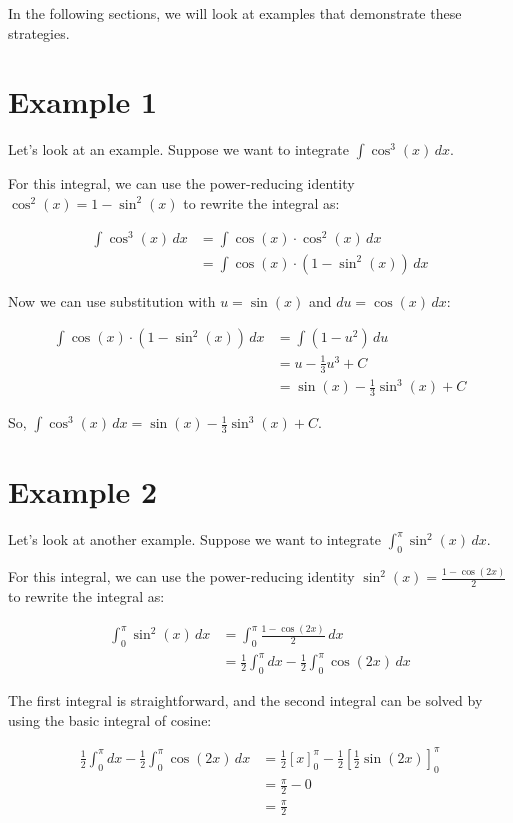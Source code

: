 \documentclass{article}
\begin{document}
In the following sections, we will look at examples that demonstrate these strategies.

\section{Example 1}

Let's look at an example. Suppose we want to integrate $\int \cos^3(x) \, dx$.

For this integral, we can use the power-reducing identity $\cos^2(x) = 1 - \sin^2(x)$ to rewrite the integral as:

\begin{align*}
    \int \cos^3(x) \, dx &= \int \cos(x) \cdot \cos^2(x) \, dx \\
    &= \int \cos(x) \cdot (1 - \sin^2(x)) \, dx
\end{align*}

Now we can use substitution with $u = \sin(x)$ and $du = \cos(x) \, dx$:

\begin{align*}
    \int \cos(x) \cdot (1 - \sin^2(x)) \, dx &= \int (1 - u^2) \, du \\
    &= u - \frac{1}{3} u^3 + C \\
    &= \sin(x) - \frac{1}{3} \sin^3(x) + C
\end{align*}

So, $\int \cos^3(x) \, dx = \sin(x) - \frac{1}{3} \sin^3(x) + C$.

\section{Example 2}

Let's look at another example. Suppose we want to integrate $\int_0^\pi \sin^2(x) \, dx$.

For this integral, we can use the power-reducing identity $\sin^2(x) = \frac{1 - \cos(2x)}{2}$ to rewrite the integral as:

\begin{align*}
    \int_0^\pi \sin^2(x) \, dx &= \int_0^\pi \frac{1 - \cos(2x)}{2} \, dx \\
    &= \frac{1}{2} \int_0^\pi dx - \frac{1}{2} \int_0^\pi \cos(2x) \, dx
\end{align*}

The first integral is straightforward, and the second integral can be solved by using the basic integral of cosine:

\begin{align*}
    \frac{1}{2} \int_0^\pi dx - \frac{1}{2} \int_0^\pi \cos(2x) \, dx &= \frac{1}{2} [x]_0^\pi - \frac{1}{2} [\frac{1}{2} \sin(2x)]_0^\pi \\
    &= \frac{\pi}{2} - 0 \\
    &= \frac{\pi}{2}
\end{align*}
\end{document}
